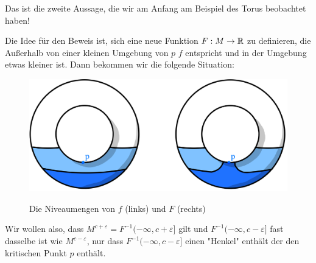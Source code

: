 Das ist die zweite Aussage, die wir am Anfang am Beispiel des Torus beobachtet haben!

Die Idee für den Beweis ist, sich eine neue Funktion $F: M \to { \mathbb R }$ zu definieren,
die Außerhalb von einer kleinen Umgebung von $p$ $f$ entspricht und in der 
Umgebung etwas kleiner ist. Dann bekommen wir die folgende Situation:

\begin{figure}[H]
    \centering
    \includegraphics[width=0.8\linewidth]{resources/Me-Diagram5-sublevelsets-of-f-and-F.jpeg}
    \label{fig:me-diagram5}
    \caption{Die Niveaumengen von $f$ (links) und $F$ (rechts)}
\end{figure}

Wir wollen also, dass $M^{c + \varepsilon} = F^{-1}(- \infty, c + \varepsilon]$ 
gilt und $F^{-1}(-\infty, c - \varepsilon]$ fast dasselbe ist wie 
$M^{c - \varepsilon}$, nur dass $F^{-1}(-\infty, c - \varepsilon]$ einen "Henkel"
enthält der den kritischen Punkt $p$ enthält.

